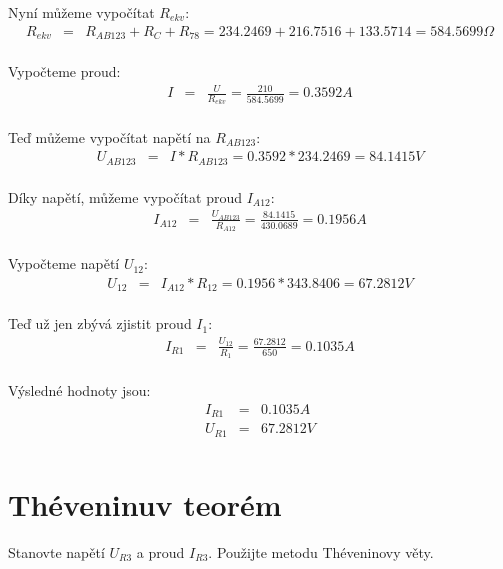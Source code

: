 \documentclass[a4paper,oneside,13pt]{article}
\begin{document}
	Nyní můžeme vypočítat $R_{ekv}$:
	\begin{eqnarray*}
		R_{ekv} & = & R_{AB123} + R_{C} + R_{78} = 234.2469 + 216.7516 + 133.5714 = 584.5699 \Omega \\
	\end{eqnarray*}

	Vypočteme proud:
	\begin{eqnarray*}
		I & = & \frac{U}{R_{ekv}} = \frac{210}{584.5699} = 0.3592A \\
	\end{eqnarray*}

	Teď můžeme vypočítat napětí na $R_{AB123}$:
	\begin{eqnarray*}
		U_{AB123} & = & I * R_{AB123} = 0.3592 * 234.2469 = 84.1415V \\
	\end{eqnarray*}

	Díky napětí, můžeme vypočítat proud $I_{A12}$:
	\begin{eqnarray*}
		I_{A12} & = & \frac{U_{AB123}}{R_{A12}} = \frac{84.1415}{430.0689} = 0.1956A \\
	\end{eqnarray*}

	Vypočteme napětí $U_{12}$:
	\begin{eqnarray*}
		U_{12} & = & I_{A12} * R_{12} = 0.1956 * 343.8406 = 67.2812V \\
	\end{eqnarray*}

	Teď už jen zbývá zjistit proud $I_{1}$:
	\begin{eqnarray*}
		I_{R1} & = & \frac{U_{12}}{R_{1}} = \frac{67.2812}{650} = 0.1035A \\
	\end{eqnarray*}

	Výsledné hodnoty jsou:
	\begin{eqnarray*}
		I_{R1} & = & 0.1035A \\
		U_{R1} & = & 67.2812V \\
	\end{eqnarray*}

	
	\newpage
	\section{Théveninuv teorém}
	
	Stanovte napětí $U_{R3}$ a proud $I_{R3}$. Použijte metodu Théveninovy věty.
	
\end{document}

